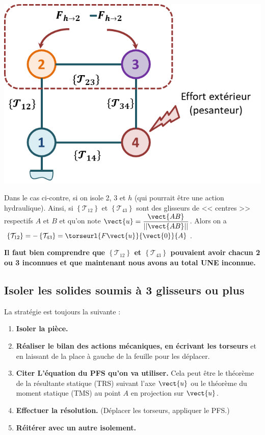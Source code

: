 \begin{minipage}[c]{.4\linewidth}
\begin{center}
\includegraphics[width=\linewidth]{images/fig_03}
\end{center}
\end{minipage}
\hfill
\begin{minipage}[c]{.55\linewidth}
Dans le cas ci-contre, si on isole 2, 3 et $h$ (qui pourrait être une action hydraulique). Ainsi, si $\left\{\mathcal{T}_{12}\right\}$ et $\left\{\mathcal{T}_{43}\right\}$ sont des glisseurs de << centres >> respectifs $A$ et $B$ et qu'on note $\vect{u}=\dfrac{\vect{AB}}{||\vect{AB}||}$. Alors on a $\left\{\mathcal{T}_{12}\right\}=-\left\{\mathcal{T}_{43}\right\}=\torseurl{F\vect{u}}{\vect{0}}{A}$. 

\textbf{Il faut bien comprendre que $\left\{\mathcal{T}_{12}\right\}$ et $\left\{\mathcal{T}_{43}\right\}$  pouvaient avoir chacun 2 ou 3 inconnues et que maintenant nous avons au total UNE inconnue.}
\end{minipage}

\subsection{Isoler les solides soumis à 3 glisseurs ou plus}

La stratégie est toujours la suivante :
\begin{enumerate}
\item \textbf{Isoler la pièce.}
\item \textbf{Réaliser le bilan des actions mécaniques, en écrivant les torseurs} et en laissant de la place à gauche de la feuille pour les déplacer.
\item \textbf{Citer L'équation du PFS qu'on va utiliser.} Cela peut être le théorème de la résultante statique (TRS) suivant l'axe $\vect{u}$ ou le théorème du moment statique (TMS) au point $A$ en projection sur $\vect{u}$.
\item \textbf{Effectuer la résolution.} (Déplacer les torseurs, appliquer le PFS.)
\item \textbf{Réitérer avec un autre isolement.}
\end{enumerate}

